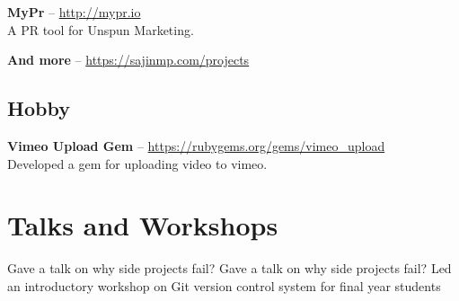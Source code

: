 \documentclass[11pt,a4paper]{moderncv}
\begin{document}
\cvlistitem
{\textbf{MyPr} -- {\small \href{http://mypr.io}{http://mypr.io}}
  \\A PR tool for Unspun Marketing.
}

\cvlistitem
{\textbf{And more} -- {\small \href{https://sajinmp.com/projects}{https://sajinmp.com/projects}}}


\subsection{Hobby}

\cvlistitem
{\textbf{Vimeo Upload Gem} -- {\small \href{https://rubygems.org/gems/vimeo\_upload}{https://rubygems.org/gems/vimeo\_upload}}
  \\Developed a gem for uploading video to vimeo.
}



\section{Talks and Workshops}
{Gave a talk on why side projects fail?}
{Gave a talk on why side projects fail?}
{Led an introductory workshop on Git version control system for final year students} 

\end{document}
